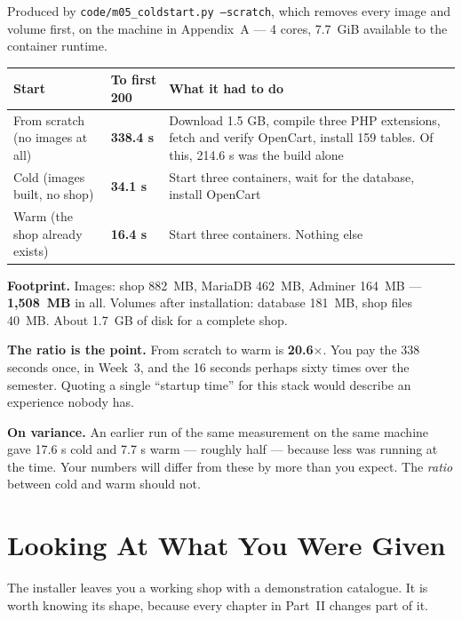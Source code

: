 \begin{measured}
Produced by \texttt{code/m05\_coldstart.py --scratch}, which removes every
image and volume first, on the machine in Appendix~A --- 4 cores, 7.7~GiB
available to the container runtime.

\begin{longtable}{@{}L{5.8cm}L{2.6cm}L{6.0cm}@{}}
\toprule
{}
\textbf{Start} & \textbf{To first 200} & \textbf{What it had to do} \\
\midrule
\endhead
From scratch (no images at all) & \textbf{338.4 s} & Download 1.5 GB, compile
three PHP extensions, fetch and verify OpenCart, install 159 tables. Of this,
214.6 s was the build alone \\
Cold (images built, no shop) & \textbf{34.1 s} & Start three containers, wait
for the database, install OpenCart \\
Warm (the shop already exists) & \textbf{16.4 s} & Start three containers.
Nothing else \\
\bottomrule
\end{longtable}

\smallskip
\textbf{Footprint.} Images: shop 882~MB, MariaDB 462~MB, Adminer 164~MB ---
\textbf{1{,}508~MB} in all. Volumes after installation: database 181~MB, shop
files 40~MB. About 1.7~GB of disk for a complete shop.

\smallskip
\textbf{The ratio is the point.} From scratch to warm is \textbf{20.6$\times$}.
You pay the 338 seconds once, in Week~3, and the 16 seconds perhaps sixty times
over the semester. Quoting a single ``startup time'' for this stack would
describe an experience nobody has.

\smallskip
\textbf{On variance.} An earlier run of the same measurement on the same
machine gave 17.6 s cold and 7.7 s warm --- roughly half --- because less was
running at the time. Your numbers will differ from these by more than you
expect. The \emph{ratio} between cold and warm should not.
\end{measured}

\section{Looking At What You Were Given}

The installer leaves you a working shop with a demonstration catalogue. It is
worth knowing its shape, because every chapter in Part~II changes part of it.

